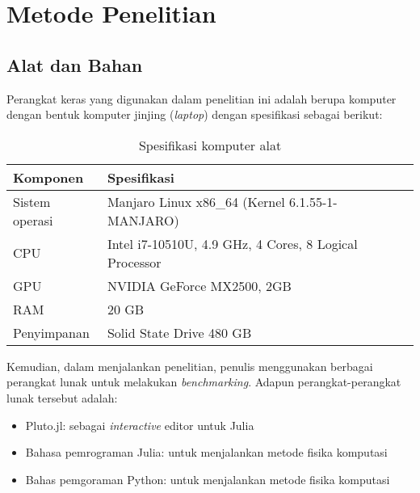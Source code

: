 \chapter{Metode Penelitian}

\section{Alat dan Bahan}

Perangkat keras yang digunakan dalam penelitian ini adalah berupa komputer dengan bentuk komputer jinjing (\emph{laptop}) dengan spesifikasi sebagai berikut:

\begin{table}[ht]
  \centering
  \caption{Spesifikasi komputer alat}
  \begin{tabular}{|M{5cm}|M{8cm}|}
    \hline
    \textbf{Komponen} & \textbf{Spesifikasi}                                   \\
    \hline
    Sistem operasi    & Manjaro Linux x86\_64 (Kernel 6.1.55-1-MANJARO)        \\
    \hline
    CPU               & Intel i7-10510U, 4.9 GHz, 4 Cores, 8 Logical Processor \\
    \hline
    GPU               & NVIDIA GeForce MX2500, 2GB                             \\
    \hline
    RAM               & 20 GB                                                  \\
    \hline
    Penyimpanan       & Solid State Drive 480 GB                               \\
    \hline
  \end{tabular}
\end{table}

Kemudian, dalam menjalankan penelitian, penulis menggunakan berbagai perangkat lunak untuk melakukan \emph{benchmarking}. Adapun perangkat-perangkat lunak tersebut adalah:
\begin{itemize}
  \item Pluto.jl: sebagai \emph{interactive} editor untuk Julia

  \item Bahasa pemrograman Julia: untuk menjalankan metode fisika komputasi

  \item Bahas pemgoraman Python: untuk menjalankan metode fisika komputasi
\end{itemize}


